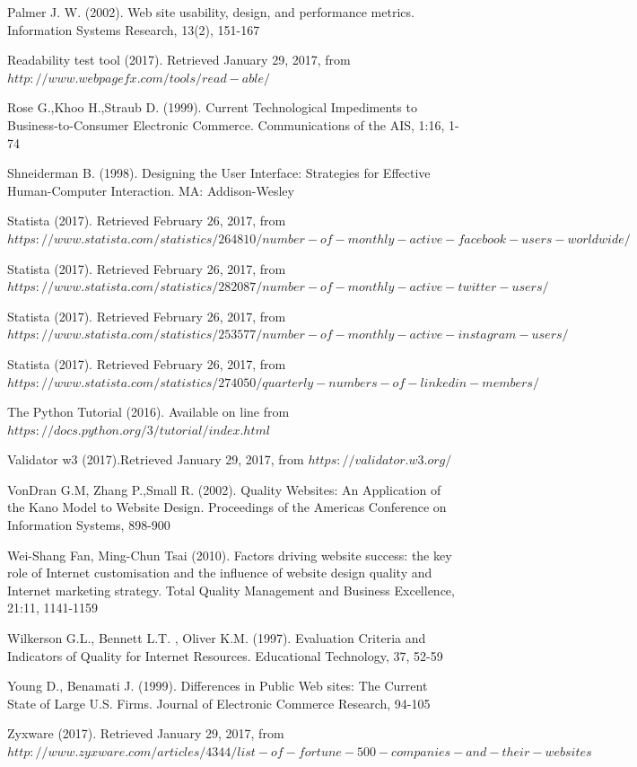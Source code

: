 \documentclass{article}
\begin{document}
\begin{thebibliography}{widest-label}
Palmer J. W. (2002). Web site usability, design, and performance metrics. Information Systems Research, 13(2), 151-167

Readability test tool (2017). Retrieved January 29, 2017, from $http://www.webpagefx.com/tools/read-able/$

Rose G.,Khoo H.,Straub D. (1999). Current Technological Impediments to Business-to-Consumer Electronic
Commerce. Communications of the AIS, 1:16, 1-74

Shneiderman B. (1998). Designing the User Interface: Strategies for Effective Human-Computer Interaction. 
MA: Addison-Wesley

Statista (2017). Retrieved February 26, 2017, from $https://www.statista.com/statistics/264810/number-of-monthly-active-facebook-users-worldwide/$

Statista (2017). Retrieved February 26, 2017, from $https://www.statista.com/statistics/282087/number-of-monthly-active-twitter-users/$

Statista (2017). Retrieved February 26, 2017, from $https://www.statista.com/statistics/253577/number-of-monthly-active-instagram-users/$

Statista (2017). Retrieved February 26, 2017, from $https://www.statista.com/statistics/274050/quarterly-numbers-of-linkedin-members/$

The Python Tutorial (2016). Available on line from $https://docs.python.org/3/tutorial/index.html$


Validator w3 (2017).Retrieved January 29, 2017, from $https://validator.w3.org/$

VonDran G.M, Zhang P.,Small R. (2002). Quality
Websites: An Application of the Kano Model to Website Design. Proceedings of the Americas Conference on Information Systems, 898-900

Wei-Shang Fan, Ming-Chun Tsai (2010). Factors driving website success: the key role of Internet customisation and the influence of website design quality and Internet
marketing strategy. Total Quality Management and Business Excellence, 21:11, 1141-1159

Wilkerson G.L., Bennett L.T. , Oliver K.M. (1997). Evaluation Criteria and Indicators of Quality for Internet Resources. Educational Technology, 37, 52-59

Young D., Benamati J. (1999). Differences in Public Web sites: The Current State of Large U.S. Firms. Journal of Electronic Commerce Research, 94-105

Zyxware (2017). Retrieved January 29, 2017, from $http://www.zyxware.com/articles/4344/list-of-fortune-500-companies-and-their-websites$
\end{thebibliography}
\newpage
\appendix
\end{document}

